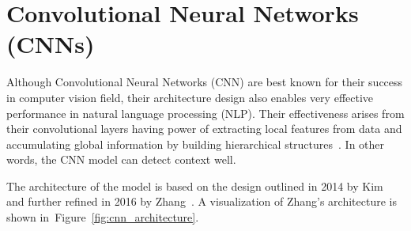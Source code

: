 
    






\section{Convolutional Neural Networks (CNNs)}

\noindent Although Convolutional Neural Networks (CNN) are best known for their success in computer vision field, their architecture design also enables very effective performance in natural language processing (NLP). Their effectiveness arises from their convolutional layers having power of extracting local features from data and accumulating global information by building hierarchical structures~\cite{shin2018contextual}. In other words, the CNN model can detect context well.

\vspace{3mm} 

\noindent The architecture of the model is based on the design outlined in 2014 by Kim~\cite{kim2014convolutionalneuralnetworkssentence} and further refined in 2016 by Zhang~\cite{zhang2016sensitivityanalysisandpractitioners}. A visualization of Zhang's architecture is shown in~Figure~\ref{fig:cnn_architecture}.

